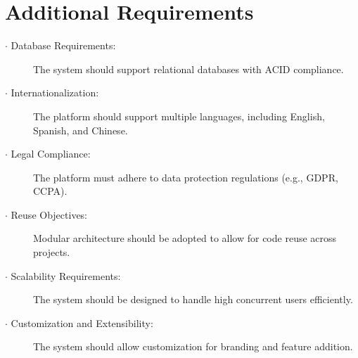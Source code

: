 \documentclass[a4paper, 11pt]{scrreprt}
\begin{document}
\section{Additional Requirements}
\begin{description}
    \item[$\cdot$ Database Requirements:] The system should support relational databases with ACID compliance.
    \item[$\cdot$ Internationalization:] The platform should support multiple languages, including English, Spanish, and Chinese.
    \item[$\cdot$ Legal Compliance:] The platform must adhere to data protection regulations (e.g., GDPR, CCPA).
    \item[$\cdot$ Reuse Objectives:] Modular architecture should be adopted to allow for code reuse across projects.
    \item[$\cdot$ Scalability Requirements:] The system should be designed to handle high concurrent users efficiently.
    \item[$\cdot$ Customization and Extensibility:] The system should allow customization for branding and feature addition.
\end{description}
\end{document}
